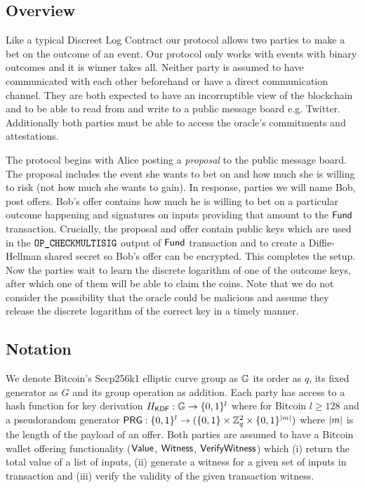 \documentclass[runningheads]{llncs}
\begin{document}
\subsection{Overview}

Like a typical Discreet Log Contract our protocol allows two parties to make a bet on the outcome of an event. Our protocol only works with events with binary outcomes and it is winner takes all. Neither party is assumed to have communicated with each other beforehand or have a direct communication channel. They are both expected to have an incorruptible view of the blockchain and to be able to read from and write to a public message board e.g. Twitter. Additionally both parties must be able to access the oracle's commitments and attestations.

The protocol begins with Alice posting a \emph{proposal} to the public message board. The proposal includes the event she wants to bet on and how much she is willing to risk (not how much she wants to gain). In response, parties we will name Bob, post offers. Bob's offer contains how much he is willing to bet on a particular outcome happening and signatures on inputs providing that amount to the $\textsf{Fund}$ transaction. Crucially, the proposal and offer contain public keys which are used in the $\texttt{OP\_CHECKMULTISIG}$ output of $\textsf{Fund}$ transaction and to create a Diffie-Hellman shared secret so Bob's offer can be encrypted. This completes the setup. Now the parties wait to learn the discrete logarithm of one of the outcome keys, after which one of them will be able to claim the coins. Note that we do not consider the possibility that the oracle could be malicious and assume they release the discrete logarithm of the correct key in a timely manner.

\subsection{Notation}

We denote Bitcoin's Secp256k1 elliptic curve group as $\mathbb{G}$ its order as $q$, its fixed generator as $G$ and its group operation as addition. Each party has access to a hash function for key derivation $H_{\textsf{KDF}}:\mathbb{G}\to\{0,1\}^{l}$ where for Bitcoin $l \geq 128$ and a pseudorandom generator $\textsf{PRG}:\{0,1\}^l\to(\{0,1\} \times \mathbb{Z}_q^2 \times \{0,1\}^{\left\lvert m \right\rvert})$ where $\left\lvert m \right\rvert$ is the length of the payload of an offer. Both parties are assumed to have a Bitcoin wallet offering functionality ($\textsf{Value}$, $\textsf{Witness}$, $\textsf{VerifyWitness}$) which (i) return the total value of a list of inputs, (ii) generate a witness for a given set of inputs in transaction and (iii) verify the validity of the given transaction witness.
\end{document}
